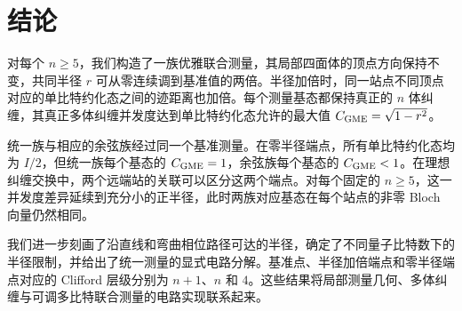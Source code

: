 \section{结论}
\label{conclusions:section}

对每个 $n\ge5$，我们构造了一族优雅联合测量，其局部四面体的顶点方向保持不变，共同半径 $r$ 可从零连续调到基准值的两倍。半径加倍时，同一站点不同顶点对应的单比特约化态之间的迹距离也加倍。每个测量基态都保持真正的 $n$ 体纠缠，其真正多体纠缠并发度达到单比特约化态允许的最大值 $C_{\rm GME}=\sqrt{1-r^2}$。

统一族与相应的余弦族经过同一个基准测量。在零半径端点，所有单比特约化态均为 $I/2$，但统一族每个基态的 $C_{\rm GME}=1$，余弦族每个基态的 $C_{\rm GME}<1$。在理想纠缠交换中，两个远端站的关联可以区分这两个端点。对每个固定的 $n\ge5$，这一并发度差异延续到充分小的正半径，此时两族对应基态在每个站点的非零 Bloch 向量仍然相同。

我们进一步刻画了沿直线和弯曲相位路径可达的半径，确定了不同量子比特数下的半径限制，并给出了统一测量的显式电路分解。基准点、半径加倍端点和零半径端点对应的 Clifford 层级分别为 $n+1$、$n$ 和 $4$。这些结果将局部测量几何、多体纠缠与可调多比特联合测量的电路实现联系起来。
